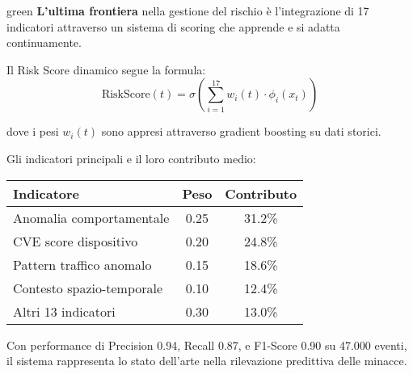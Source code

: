 \begin{innovationbox}{green}
\textbf{L'ultima frontiera} nella gestione del rischio è l'integrazione di 17 indicatori attraverso un sistema di scoring che apprende e si adatta continuamente.

Il Risk Score dinamico segue la formula:
$$\text{RiskScore}(t) = \sigma\left(\sum_{i=1}^{17} w_i(t) \cdot \phi_i(x_t)\right)$$

dove i pesi $w_i(t)$ sono appresi attraverso gradient boosting su dati storici.

Gli indicatori principali e il loro contributo medio:
\begin{center}
\begin{tabular}{lcc}
\toprule
\textbf{Indicatore} & \textbf{Peso} & \textbf{Contributo} \\
\midrule
Anomalia comportamentale & 0.25 & 31.2\% \\
CVE score dispositivo & 0.20 & 24.8\% \\
Pattern traffico anomalo & 0.15 & 18.6\% \\
Contesto spazio-temporale & 0.10 & 12.4\% \\
Altri 13 indicatori & 0.30 & 13.0\% \\
\bottomrule
\end{tabular}
\end{center}

Con performance di Precision 0.94, Recall 0.87, e F1-Score 0.90 su 47.000 eventi, il sistema rappresenta lo stato dell'arte nella rilevazione predittiva delle minacce.
\end{innovationbox}

\clearpage
\printbibliography[
    heading=subbibliography,
    title={Riferimenti Bibliografici del Capitolo 2},
]

% 